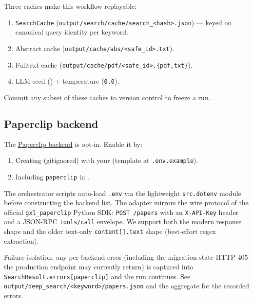 \documentclass[
]{article}
\providecommand{\tightlist}{%
  \setlength{\itemsep}{0pt}\setlength{\parskip}{0pt}}
\begin{document}
Three caches make this workflow replayable:

\begin{enumerate}
\def\labelenumi{\arabic{enumi}.}
\tightlist
\item
  \texttt{SearchCache}
  (\texttt{output/search/cache/search\_\textless{}hash\textgreater{}.json})
  --- keyed on canonical query identity per keyword.
\item
  Abstract cache
  (\texttt{output/cache/abs/\textless{}safe\_id\textgreater{}.txt}).
\item
  Fulltext cache
  (\texttt{output/cache/pdf/\textless{}safe\_id\textgreater{}.\{pdf,txt\}}).
\item
  LLM seed () + temperature
  (\texttt{0.0}).
\end{enumerate}

Commit any subset of these caches to version control to freeze a run.

\subsection{Paperclip backend}\label{paperclip-backend}

The \href{https://paperclip.gxl.ai}{Paperclip backend} is opt-in. Enable
it by:

\begin{enumerate}
\def\labelenumi{\arabic{enumi}.}
\tightlist
\item
  Creating 
  (gitignored) with your  (template
  at \texttt{.env.example}).
\item
  Including \texttt{paperclip} in .
\end{enumerate}

The orchestrator scripts auto-load \texttt{.env} via the lightweight
\texttt{src.dotenv} module before constructing the backend list. The
 adapter mirrors the wire protocol of the
official \texttt{gxl\_paperclip} Python SDK: \texttt{POST\ /papers} with
an \texttt{X-API-Key} header and a JSON-RPC \texttt{tools/call}
envelope. We support both the modern 
response shape and the older text-only \texttt{content{[}{]}.text} shape
(best-effort regex extraction).

Failure-isolation: any per-backend error (including the migration-state
HTTP 405 the production endpoint may currently return) is captured into
\texttt{SearchResult.errors{[}paperclip{]}} and the run continues. See
\texttt{output/deep\_search/\textless{}keyword\textgreater{}/papers.json}
and the aggregate  for the recorded errors.
\end{document}
